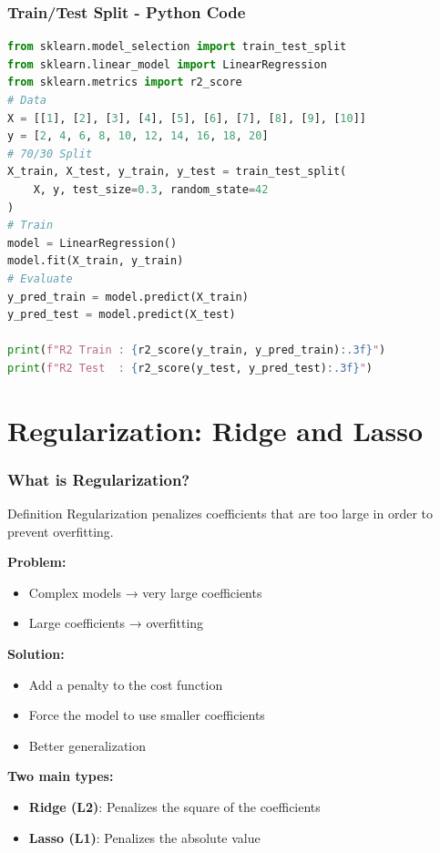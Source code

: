 \documentclass{beamer}
\begin{document}
\begin{frame}[fragile]
\frametitle{Train/Test Split - Python Code}
\begin{lstlisting}[language=Python]
from sklearn.model_selection import train_test_split
from sklearn.linear_model import LinearRegression
from sklearn.metrics import r2_score
# Data
X = [[1], [2], [3], [4], [5], [6], [7], [8], [9], [10]]
y = [2, 4, 6, 8, 10, 12, 14, 16, 18, 20]
# 70/30 Split
X_train, X_test, y_train, y_test = train_test_split(
    X, y, test_size=0.3, random_state=42
)
# Train
model = LinearRegression()
model.fit(X_train, y_train)
# Evaluate
y_pred_train = model.predict(X_train)
y_pred_test = model.predict(X_test)

print(f"R2 Train : {r2_score(y_train, y_pred_train):.3f}")
print(f"R2 Test  : {r2_score(y_test, y_pred_test):.3f}")
\end{lstlisting}
\end{frame}

\section{Regularization: Ridge and Lasso}

\begin{frame}
\frametitle{What is Regularization?}
\begin{block}{Definition}
Regularization penalizes coefficients that are too large in order to prevent overfitting.
\end{block}

\vspace{1em}
\textbf{Problem:}
\begin{itemize}
    \item Complex models → very large coefficients
    \item Large coefficients → overfitting
\end{itemize}

\vspace{1em}
\textbf{Solution:}
\begin{itemize}
    \item Add a penalty to the cost function
    \item Force the model to use smaller coefficients
    \item Better generalization
\end{itemize}

\vspace{1em}
\textbf{Two main types:}
\begin{itemize}
    \item \textbf{Ridge (L2)}: Penalizes the square of the coefficients
    \item \textbf{Lasso (L1)}: Penalizes the absolute value
\end{itemize}
\end{frame}
\end{document}

